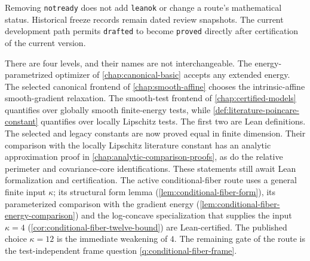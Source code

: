 Removing \texttt{notready} does not add \texttt{leanok} or change a route's mathematical status.
Historical freeze records remain dated review snapshots. The current development path permits
\texttt{drafted} to become \texttt{proved} directly after certification of the current version.

There are four levels, and their names are not interchangeable.  The energy-parametrized optimizer
of \cref{chap:canonical-basic} accepts any extended energy.  The selected canonical frontend of
\cref{chap:smooth-affine} chooses the intrinsic-affine smooth-gradient relaxation.  The
smooth-test frontend of \cref{chap:certified-models} quantifies over globally smooth finite-energy
tests, while \cref{def:literature-poincare-constant} quantifies over locally Lipschitz tests.  The
first two are Lean definitions. The selected and legacy constants are now proved equal in
finite dimension. Their comparison with the locally Lipschitz literature constant has an
analytic approximation proof in \cref{chap:analytic-comparison-proofs}, as do the relative
perimeter and covariance-core identifications. These statements still await Lean formalization
and certification. The active conditional-fiber route uses a general finite input
$\kappa$; its structural form lemma (\cref{lem:conditional-fiber-form}), its parameterized
comparison with the gradient energy (\cref{lem:conditional-fiber-energy-comparison}) and the
log-concave specialization that supplies the input $\kappa=4$
(\cref{cor:conditional-fiber-twelve-bound}) are Lean-certified.  The published choice
$\kappa=12$ is the immediate weakening of $4$.  The remaining gate of the route is the
test-independent frame question \cref{q:conditional-fiber-frame}.
